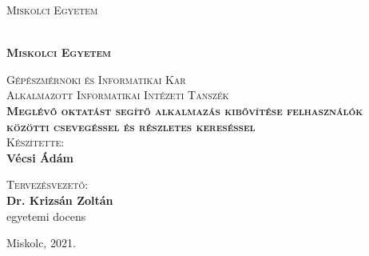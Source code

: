 \pagestyle{empty} %
\newcommand{\nev}{Vécsi Ádám}
\newcommand{\neptun}{IZBTF9}
\newcommand{\cim}{Meglévő oktatást segítő alkalmazás kibővítése felhasználók közötti csevegéssel és részletes kereséssel}

\begin{center}
	\textsc{\Large{Miskolci Egyetem}}
	
{\large
	\begin{center}
		\\
		\textbf{\textsc{Miskolci Egyetem}}
\end{center}}
	
	\textsc{\Large{Gépészmérnöki és Informatikai Kar}}\\	
	\vspace{5mm}	
	\textsc{\Large{Alkalmazott Informatikai Intézeti Tanszék}}\\
	
	\vspace{14mm}	
	\textsc{\Large{\textbf{\cim}}}\\
	
	\vspace{10mm}
	\textsc{Készítette:}\\
	\textbf{\nev}\\
	\vspace{20mm}
	
	\textsc{Tervezésvezető:}\\
	\textbf{Dr. Krizsán Zoltán}\\
	egyetemi docens\\
	\vspace{50mm}
	
	\vspace{20mm} Miskolc, 2021.	
	
\end{center}

\newpage